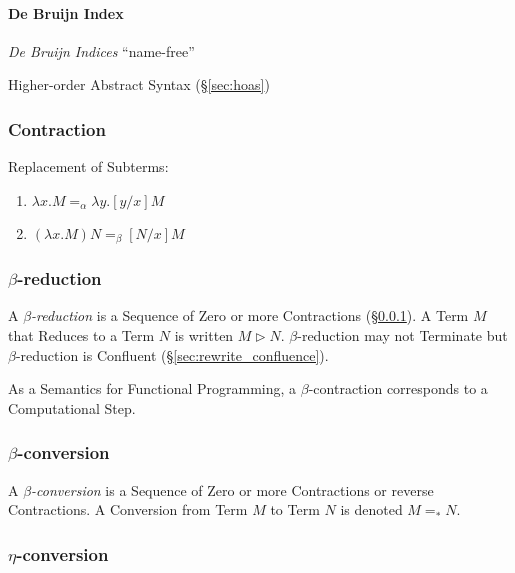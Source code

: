 \paragraph{De Bruijn Index}\label{sec:debruijn_index}\hfill

\emph{De Bruijn Indices} ``name-free''

Higher-order Abstract Syntax (\S\ref{sec:hoas})



\subsubsection{Contraction}\label{sec:contraction}\cite{seldin03}

Replacement of Subterms:
\begin{enumerate}
  \item $\lambda x . M =_\alpha \lambda y . [y/x]M$
  \item $(\lambda x . M)N =_\beta [N/x]M$
\end{enumerate}



\subsubsection{$\beta$-reduction}\label{sec:beta_reduction}

A \emph{$\beta$-reduction} is a Sequence of Zero or more Contractions
(\S\ref{sec:contraction}). A Term $M$ that Reduces to a Term $N$ is
written $M \rhd N$. $\beta$-reduction may not Terminate but
$\beta$-reduction is Confluent (\S\ref{sec:rewrite_confluence}).

As a Semantics for Functional Programming, a $\beta$-contraction
corresponds to a Computational Step.



\subsubsection{$\beta$-conversion}\label{sec:beta_conversion}
\cite{seldin03}

A \emph{$\beta$-conversion} is a Sequence of Zero or more Contractions
or reverse Contractions. A Conversion from Term $M$ to Term $N$ is
denoted $M =_* N$.



\subsubsection{$\eta$-conversion}\label{sec:eta_conversion}

